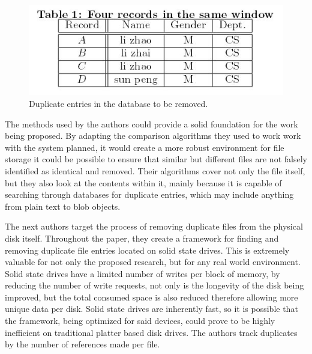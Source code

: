 \documentclass[11pt]{article}
\begin{document}
\begin{figure}
\begin{center}
\includegraphics[scale=.8]{duptable}
\caption{\label{fig:duptable} Duplicate entries in the database to be removed.}
\end{center}
\end{figure}

The methods used by the authors could provide a solid foundation for the work being proposed. By adapting the comparison algorithms they used to work work with the system planned, it would create a more robust environment for file storage it could be possible to ensure that similar but different files are not falsely identified as identical and removed. Their algorithms cover not only the file itself, but they also look at the contents within it, mainly because it is capable of searching through databases for duplicate entries, which may include anything from plain text to blob objects. 

The next authors target the process of removing duplicate files from the physical disk itself. Throughout the paper, they create a framework for finding and removing duplicate file entries located on solid state drives. \cite{Wu} This is extremely valuable for not only the proposed research, but for any real world environment. Solid state drives have a limited number of writes per block of memory, by reducing the number of write requests, not only is the longevity of the disk being improved, but the total consumed space is also reduced therefore allowing more unique data per disk. Solid state drives are inherently fast, so it is possible that the framework, being optimized for said devices, could prove to be highly inefficient on traditional platter based disk drives. The authors track duplicates by the number of references made per file.
\end{document}
